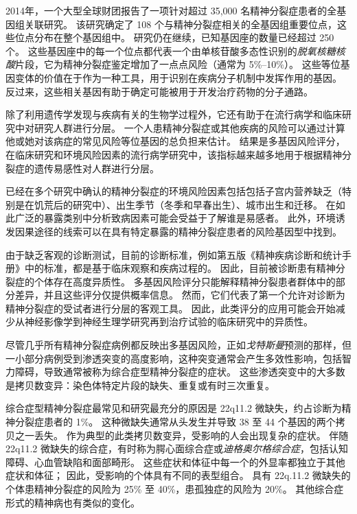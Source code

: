 2014年，一个大型全球财团报告了一项针对超过 35,000 名精神分裂症患者的全基因组关联研究。
该研究确定了 108 个与精神分裂症相关的全基因组重要位点，这些位点分布在整个基因组中。
研究仍在继续，已知基因座的数量已经超过 250 个。
这些基因座中的每一个位点都代表一个由单核苷酸多态性识别的\textit{脱氧核糖核酸}片段，它为精神分裂症鉴定增加了一点点风险（通常为 5\%–10\%）。
这些等位基因变体的价值在于作为一种工具，用于识别在疾病分子机制中发挥作用的基因。
反过来，这些相关基因有助于确定可能被用于开发治疗药物的分子通路。


除了利用遗传学发现与疾病有关的生物学过程外，它还有助于在流行病学和临床研究中对研究人群进行分层。
一个人患精神分裂症或其他疾病的风险可以通过计算他或她对该病症的常见风险等位基因的总负担来估计。
结果是多基因风险评分，在临床研究和环境风险因素的流行病学研究中，该指标越来越多地用于根据精神分裂症的遗传易感性对人群进行分层。


已经在多个研究中确认的精神分裂症的环境风险因素包括包括子宫内营养缺乏（特别是在饥荒后的研究中）、出生季节（冬季和早春出生）、城市出生和迁移。
在如此广泛的暴露类别中分析致病因素可能会受益于了解谁是易感者。
此外，环境诱发因果途径的线索可以在具有特定暴露的精神分裂症患者的风险基因型中找到。


由于缺乏客观的诊断测试，目前的诊断标准，例如第五版《精神疾病诊断和统计手册》中的标准，都是基于临床观察和疾病过程的。
因此，目前被诊断患有精神分裂症的个体存在高度异质性。
多基因风险评分只能解释精神分裂患者群体中的部分差异，并且这些评分仅提供概率信息。
然而，它们代表了第一个允许对诊断为精神分裂症的受试者进行分层的客观工具。
因此，此类评分的应用可能会开始减少从神经影像学到神经生理学研究再到治疗试验的临床研究中的异质性。


尽管几乎所有精神分裂症病例都反映出多基因风险，正如\textit{戈特斯曼}预测的那样，但一小部分病例受到渗透突变的高度影响，这种突变通常会产生多效性影响，包括智力障碍，导致通常被称为综合症型精神分裂症的症状。
这些渗透突变中的大多数是拷贝数变异：染色体特定片段的缺失、重复或有时三次重复。


综合症型精神分裂症最常见和研究最充分的原因是 22q11.2 微缺失，约占诊断为精神分裂症患者的 1\%。
这种微缺失通常从头发生并导致 38 至 44 个基因的两个拷贝之一丢失。
作为典型的此类拷贝数变异，受影响的人会出现复杂的症状。
伴随 22q11.2 微缺失的综合症，有时称为腭心面综合症或\textit{迪格奥尔格综合症}，包括认知障碍、心血管缺陷和面部畸形。
这些症状和体征中每一个的外显率都独立于其他症状和体征；
因此，受影响的个体具有不同的表型组合。
具有 22q.11.2 微缺失的个体患精神分裂症的风险为 25\% 至 40\%，患孤独症的风险为 20\%。
其他综合症形式的精神病也有类似的变化。



